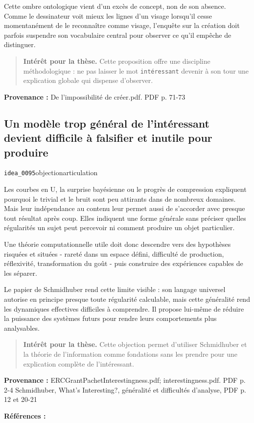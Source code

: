 \documentclass[10pt,a4paper]{article}
\begin{document}
Cette ombre ontologique vient d'un excès de concept, non de son absence. Comme le dessinateur voit mieux les lignes d'un visage lorsqu'il cesse momentanément de le reconnaître comme visage, l'enquête sur la création doit parfois suspendre son vocabulaire central pour observer ce qu'il empêche de distinguer.

\begin{quote}
\textbf{Intérêt pour la thèse.} Cette proposition offre une discipline méthodologique : ne pas laisser le mot \texttt{intéressant} devenir à son tour une explication globale qui dispense d'observer.
\end{quote}
{\footnotesize\color{metadata}\textbf{Provenance :} De l'impossibilité de créer.pdf. PDF p. 71-73\par}

\subsection{Un modèle trop général de l'intéressant devient difficile à falsifier et inutile pour produire}
{\small\color{metadata} \texttt{idea\_0095}\quad\textbullet\quad objection\quad\textbullet\quad articulation\par}

Les courbes en U, la surprise bayésienne ou le progrès de compression expliquent pourquoi le trivial et le bruit sont peu attirants dans de nombreux domaines. Mais leur indépendance au contenu leur permet aussi de s'accorder avec presque tout résultat après coup. Elles indiquent une forme générale sans préciser quelles régularités un sujet peut percevoir ni comment produire un objet particulier.

Une théorie computationnelle utile doit donc descendre vers des hypothèses risquées et situées - rareté dans un espace défini, difficulté de production, réflexivité, transformation du goût - puis construire des expériences capables de les séparer.

Le papier de Schmidhuber rend cette limite visible : son langage universel autorise en principe presque toute régularité calculable, mais cette généralité rend les dynamiques effectives difficiles à comprendre. Il propose lui-même de réduire la puissance des systèmes futurs pour rendre leurs comportements plus analysables.

\begin{quote}
\textbf{Intérêt pour la thèse.} Cette objection permet d'utiliser Schmidhuber et la théorie de l'information comme fondations sans les prendre pour une explication complète de l'intéressant.
\end{quote}
{\footnotesize\color{metadata}\textbf{Provenance :} ERCGrantPachetInterestingness.pdf; interestingness.pdf. PDF p. 2-4 Schmidhuber, What's Interesting?, généralité et difficultés d'analyse, PDF p. 12 et 20-21\par}
{\footnotesize\color{metadata}\textbf{Références :} \parencite{schmidhuber1997interesting}\par}
\end{document}
